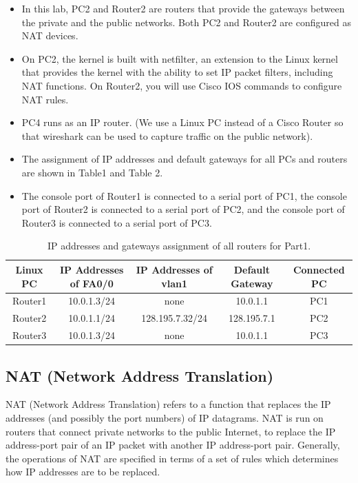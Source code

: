 \begin{itemize}
	\item In this lab, PC2 and Router2 are routers that provide the gateways between the private and the public networks. Both PC2 and Router2 are configured as NAT devices.
	\item On PC2, the kernel is built with netfilter, an extension to the Linux kernel that provides the kernel with the ability to set IP packet filters, including NAT functions. On Router2, you will use Cisco IOS commands to configure NAT rules.
	\item PC4 runs as an IP router. (We use a Linux PC instead of a Cisco Router so that wireshark can be used to capture traffic on the public network).
	\item The assignment of IP addresses and default gateways for all PCs and routers are shown in Table1 and Table 2.
	\item The console port of Router1 is connected to a serial port of PC1, the console port of Router2 is connected to a serial port of PC2, and the console port of Router3 is connected to a serial port of PC3.
\end{itemize}

\begin{table}[h!t]
	\centering
	\begin{tabular}{| c | c | c | c | c |}	
		\hline
		\textbf{Linux PC} & \textbf{IP Addresses of FA0/0} & \textbf{IP Addresses of vlan1} & \textbf{Default Gateway} & \textbf{Connected PC} \\ \hline
		Router1 & 10.0.1.3/24 & none & 10.0.1.1 & PC1 \\ 
		Router2 & 10.0.1.1/24 & 128.195.7.32/24 & 128.195.7.1 & PC2 \\
		Router3 & 10.0.1.3/24 & none & 10.0.1.1 & PC3\\ \hline
	\end{tabular}
	\caption{IP addresses and gateways assignment of all routers for Part1.}
	\label{tab:lab7-part1-ip-addresses-routers}
\end{table}

\newpage
\subsection{NAT (Network Address Translation)}

NAT (Network Address Translation) refers to a function that replaces the IP addresses (and possibly the port numbers) of IP datagrams. NAT is run on routers that connect private networks to the public Internet, to replace the IP address-port pair of an IP packet with another IP address-port pair. Generally, the operations of NAT are specified in terms of a set of rules which determines how IP addresses are to be replaced.

